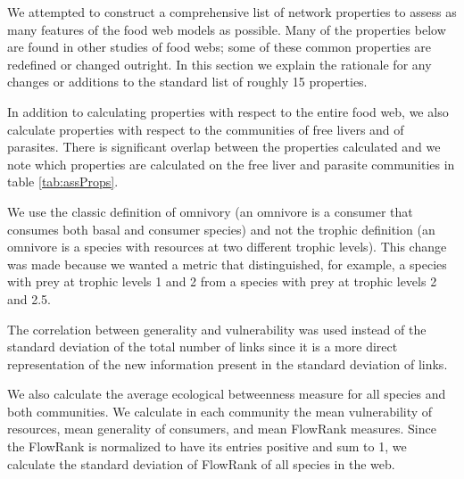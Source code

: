 \documentclass[/home/nkappler/Research/Dissertation/
 dissertation.tex]{subfiles}
\begin{document}
\begin{bibunit}
We attempted to construct a comprehensive list of network properties to assess
as many features of the food web models as possible. Many of the properties
below are found in other studies of food webs; some of these common properties
are redefined or changed outright. In this section we explain the rationale for
any changes or additions to the standard list of roughly 15 properties.

In addition to calculating properties with respect to the entire food web, we
also calculate properties with respect to the communities of free livers and of
parasites. There is significant overlap between the properties calculated and
we note which properties are calculated on the free liver and parasite
communities in table \ref{tab:assProps}.

We use the classic definition of omnivory (an omnivore is a consumer that
consumes both basal and consumer species) and not the trophic definition (an
omnivore is a species with resources at two different trophic levels). This
change was made because we wanted a metric that distinguished, for example, a
species with prey at trophic levels 1 and 2 from a species with prey at trophic
levels 2 and 2.5.

The correlation between generality and vulnerability was used instead of the
standard deviation of the total number of links since it is a more direct
representation of the new information present in the standard deviation of
links. 

We also calculate the average ecological betweenness measure for all species
and both communities. We calculate in each community the mean vulnerability of
resources, mean generality of consumers, and mean FlowRank measures. Since the
FlowRank is normalized to have its entries positive and sum to 1, we calculate
the standard deviation of FlowRank of all species in the web.


\end{bibunit}
\end{document}
